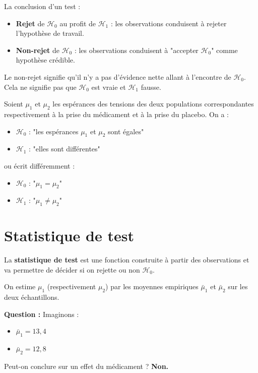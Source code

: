 La conclusion d'un test :

\begin{itemize}
\item \textbf{Rejet} de $\mathcal{H}_0$ au profit de $\mathcal{H}_1$ : les observations conduisent à rejeter l'hypothèse de travail.
\item \textbf{Non-rejet} de $\mathcal{H}_0$ : les observations conduisent à "accepter $\mathcal{H}_0$" comme hypothèse crédible.
\end{itemize}

Le non-rejet signifie qu'il n'y a pas d'évidence nette allant à l'encontre de $\mathcal{H}_0$. Cela ne signifie pas que $\mathcal{H}_0$ est vraie et $\mathcal{H}_1$ fausse.

\begin{exemple}
Soient $\mu_1$ et $\mu_2$ les espérances des tensions des deux populations correspondantes respectivement à la prise du médicament et à la prise du placebo. On a :
\begin{itemize}
\item $\mathcal{H}_0$ : "les espérances $\mu_1$ et $\mu_2$ sont égales"
\item $\mathcal{H}_1$ : "elles sont différentes"
\end{itemize}
ou écrit différemment :
\begin{itemize}
\item $\mathcal{H}_0$ : "$\mu_1 = \mu_2$"
\item $\mathcal{H}_1$ : "$\mu_1 \neq \mu_2$"
\end{itemize}
\end{exemple}

\section{Statistique de test}

\begin{definition}
La \textbf{statistique de test} est une fonction construite à partir des observations et va permettre de décider si on rejette ou non $\mathcal{H}_0$.
\end{definition}

\begin{exemple}
On estime $\mu_1$ (respectivement $\mu_2$) par les moyennes empiriques $\bar{\mu}_1$ et $\bar{\mu}_2$ sur les deux échantillons.

\textbf{Question :} Imaginons :
\begin{itemize}
\item $\bar{\mu}_1 = 13{,}4$
\item $\bar{\mu}_2 = 12{,}8$
\end{itemize}
Peut-on conclure sur un effet du médicament ? \textbf{Non.}
\end{exemple}

